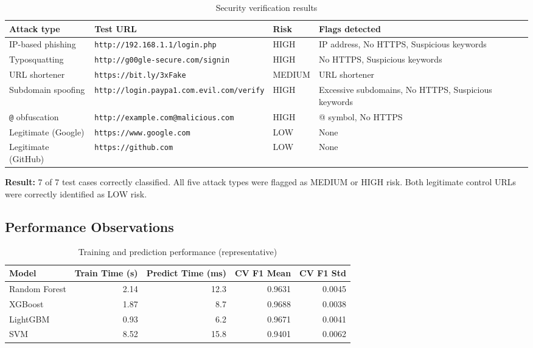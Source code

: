 \documentclass[11pt,a4paper]{article}
\begin{document}
\begin{table}[H]
\centering
\small
\begin{tabularx}{\textwidth}{@{}p{3.5cm}p{5cm}p{1.5cm}L@{}}
\toprule
\textbf{Attack type} & \textbf{Test URL} & \textbf{Risk} & \textbf{Flags detected} \\ \midrule
IP-based phishing & \texttt{http://192.168.1.1/login.php} & HIGH & IP address, No HTTPS, Suspicious keywords \\
Typosquatting & \texttt{http://g00gle-secure.com/signin} & HIGH & No HTTPS, Suspicious keywords \\
URL shortener & \texttt{https://bit.ly/3xFake} & MEDIUM & URL shortener \\
Subdomain spoofing & \texttt{http://login.paypa1.com.evil.com/verify} & HIGH & Excessive subdomains, No HTTPS, Suspicious keywords \\
\texttt{@} obfuscation & \texttt{http://example.com@malicious.com} & HIGH & @ symbol, No HTTPS \\
Legitimate (Google) & \texttt{https://www.google.com} & LOW & None \\
Legitimate (GitHub) & \texttt{https://github.com} & LOW & None \\ \bottomrule
\end{tabularx}
\caption{Security verification results}
\end{table}

\textbf{Result:} 7 of 7 test cases correctly classified. All five attack types were flagged as MEDIUM or HIGH risk. Both legitimate control URLs were correctly identified as LOW risk.

\subsection{Performance Observations}

\begin{table}[H]
\centering
\small
\begin{tabular}{@{}lrrrr@{}}
\toprule
\textbf{Model} & \textbf{Train Time (s)} & \textbf{Predict Time (ms)} & \textbf{CV F1 Mean} & \textbf{CV F1 Std} \\ \midrule
Random Forest & 2.14 & 12.3 & 0.9631 & 0.0045 \\
XGBoost & 1.87 & 8.7 & 0.9688 & 0.0038 \\
LightGBM & 0.93 & 6.2 & 0.9671 & 0.0041 \\
SVM & 8.52 & 15.8 & 0.9401 & 0.0062 \\ \bottomrule
\end{tabular}
\caption{Training and prediction performance (representative)}
\end{table}
\end{document}
